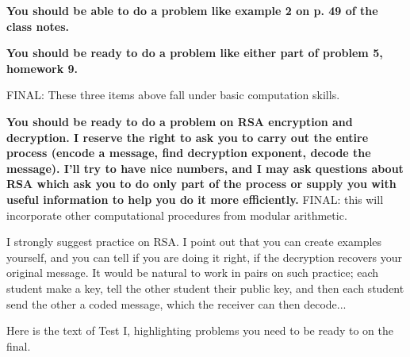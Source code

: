 \documentclass[12pt]{article}
\begin{document}
\begin{description}
{\bf You should be able to do a problem like example 2 on p. 49 of the class notes.}

{\bf You should be ready to do a problem like either part of problem 5, homework 9.}

FINAL:  These three items above fall under basic computation skills.

{\bf You should be ready to do a problem on RSA encryption and decryption.  I reserve the right to ask you to carry out the entire process (encode a message, find decryption exponent, decode the message).  I'll try to have nice numbers, and I may ask questions about RSA which ask you to do only part of the process or supply you with useful information to help you do it more efficiently.}  FINAL:  this will incorporate other computational procedures from modular arithmetic.

I strongly suggest practice on RSA.  I point out that you can create examples yourself, and you can tell if you are doing it right, if the decryption recovers your original message.  It would be natural to work in pairs on such practice;  each student make a key, tell the other student their public key, and then each student send the other a coded message, which the receiver can then decode...


\end{description}

Here is the text of Test I, highlighting problems you need to be ready to on the final.
\end{document}
